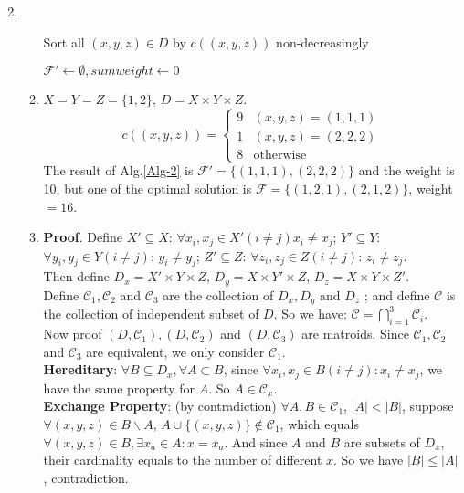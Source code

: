 \documentclass[12pt,a4paper]{article}
\makeatletter
\newtheorem*{solution}{Solution}
\theoremstyle{definition}
\renewenvironment{solution}[1][Solution] {\par\pushQED{\qed}\normalfont\topsep6\p@\@plus6\p@\relax\trivlist\item[\hskip\labelsep\bfseries#1\@addpunct{.}]\ignorespaces}{\popQED\endtrivlist\@endpefalse} \makeatother
\makeatother
\begin{document}
\begin{enumerate}
\begin{solution}
\begin{enumerate}
\begin{minipage}[t]{0.89\textwidth}
\begin{algorithm}[H]
					Sort all $ (x,y,z) \in D$ by $ c((x,y,z)) $ non-decreasingly\;
					
					$ \mathcal{F'} \leftarrow \emptyset ,sumweight\leftarrow0$\;
					
					
					\;
					
				\end{algorithm}
			\end{minipage}
			\item $ X = Y = Z = \{1,2\} $, $ D = X\times Y\times Z $.
			$$c((x,y,z))=
			\begin{cases}
			9 &(x,y,z) = (1,1,1)\\
			1 &(x,y,z) = (2,2,2)\\
			8 &\text{otherwise}
			\end{cases}
			$$
			The result of Alg.\ref{Alg-2} is $ \mathcal{F'}=\{(1,1,1),(2,2,2)\} $ and the weight is 10, but one of the optimal solution is $ \mathcal{F}=\{(1,2,1),(2,1,2)\} $, weight$ = 16 $.
			\item
			\textbf{Proof}. Define $ X'\subseteq X$: $ \forall x_i,x_j\in X' (i\neq j) x_i\neq x_j  $; $ Y'\subseteq Y $: $ \forall y_i,y_j\in Y (i\neq j)$: $ y_i\neq y_j$; $ Z' \subseteq Z $: $ \forall z_i,z_j\in Z (i\neq j)$: $ z_i\neq z_j$.\\
			Then define $ D_x= X'\times Y\times Z$, $ D_y= X\times Y'\times Z$, $ D_z= X\times Y\times Z'$. \\ 
			Define $ \mathcal{C}_1,\mathcal{C}_2 $ and $ \mathcal{C}_3 $ are the collection of $ D_x,D_y $ and $ D_z $ ; and define $ \mathcal{C} $ is the collection of independent subset of $ D $. So we have: $ \mathcal{C}=\bigcap_{i=1}^{3} \mathcal{C}_{i} $.\\
			Now proof $ (D,\mathcal{C}_1),(D,\mathcal{C}_2) $ and $ (D,\mathcal{C}_3) $ are matroids. Since $ \mathcal{C}_1,\mathcal{C}_2 $ and $ \mathcal{C}_3 $ are equivalent, we only consider $ \mathcal{C}_1 $.\\
			\textbf{Hereditary}: $ \forall B\subseteq D_x, \forall A \subset B$, since $ \forall x_i,x_j\in B(i\neq j): x_i\neq x_j $, we have the same property for $ A $. So $ A\in\mathcal{C}_x $.\\
			\textbf{Exchange Property}: (by contradiction) $\forall A,B\in \mathcal{C}_1$, $ |A|<|B| $, suppose $ \forall (x,y,z)\in B\backslash A$, $ A\cup \{(x,y,z)\}\notin \mathcal{C}_1$, which equals $ \forall (x,y,z)\in B,\exists x_a \in A: x = x_a $. And since $ A $ and $ B $ are subsets of $ D_x $, their cardinality equals to the number of different $ x $. So we have $ |B|\leq|A| $, contradiction.\\

\end{enumerate}
\end{solution}
\end{enumerate}
\end{document}
